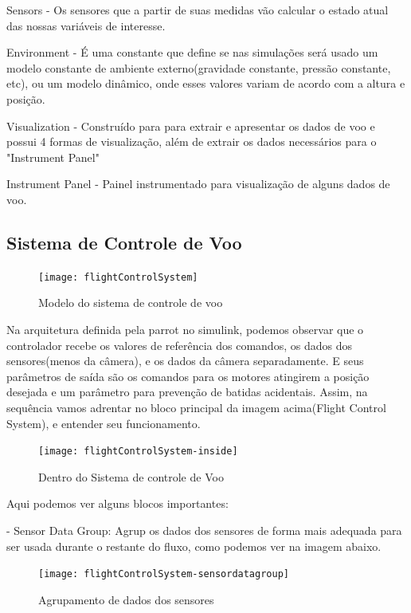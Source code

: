Sensors - Os sensores que a partir de suas medidas vão calcular o estado atual das nossas variáveis de interesse.

Environment - É uma constante que define se nas simulações será usado um modelo constante de ambiente externo(gravidade constante, pressão constante, etc), ou um modelo dinâmico, onde esses valores variam de acordo com a altura e posição.

Visualization - Construído para para extrair e apresentar os dados de voo e possui 4 formas de visualização, além de extrair os dados necessários para o "Instrument Panel"

Instrument Panel - Painel instrumentado para visualização de alguns dados de voo.

\subsection{Sistema de Controle de Voo}

\begin{figure}[H]
	\centering
	\texttt{[image: flightControlSystem]}
	\caption{Modelo do sistema de controle de voo}
	\centering
	\label{flightControlSystem}
\end{figure}

Na arquitetura definida pela parrot no simulink, podemos observar que o controlador recebe os valores de referência dos comandos, os dados dos sensores(menos da câmera), e os dados da câmera separadamente. E seus parâmetros de saída são os comandos para os motores atingirem a posição desejada e um parâmetro para prevenção de batidas acidentais. Assim, na sequência vamos adrentar no bloco principal da imagem acima(Flight Control System), e entender seu funcionamento.


\begin{figure}[H]
	\centering
	\texttt{[image: flightControlSystem-inside]}
	\caption{Dentro do Sistema de controle de Voo}
	\centering
	\label{flightControlSystem-inside}
\end{figure}


Aqui podemos ver alguns blocos importantes:

- Sensor Data Group: Agrup os dados dos sensores de forma mais adequada para ser usada durante o restante do fluxo, como podemos ver na imagem abaixo.

\begin{figure}[H]
	\centering
	\texttt{[image: flightControlSystem-sensordatagroup]}
	\caption{Agrupamento de dados dos sensores}
	\centering
	\label{flightControlSystem-sensordatagroup}
\end{figure}

